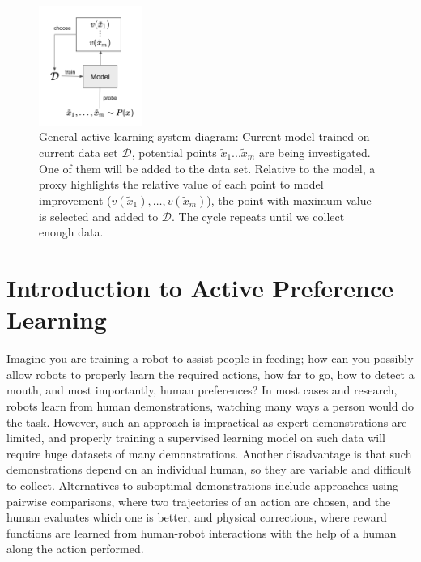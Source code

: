 \documentclass[
  letterpaper,
  DIV=11,
  numbers=noendperiod,
  oneside]{scrreprt}
\theoremstyle{remark}
\begin{document}
\begin{figure}

{\centering \includegraphics[width=0.3\textwidth,height=\textheight]{Figures/active_learning_schema.png}

}

\caption{General active learning system diagram: Current model trained
on current data set \(\mathcal{D}\), potential points
\(\tilde{x}_1...\tilde{x}_m\) are being investigated. One of them will
be added to the data set. Relative to the model, a proxy highlights the
relative value of each point to model improvement
(\(v(\tilde{x}_1), \ldots, v(\tilde{x}_m)\)), the point with maximum
value is selected and added to \(\mathcal{D}\). The cycle repeats until
we collect enough data.}

\end{figure}%

\section{Introduction to Active Preference
Learning}\label{introduction-to-active-preference-learning}

Imagine you are training a robot to assist people in feeding; how can
you possibly allow robots to properly learn the required actions, how
far to go, how to detect a mouth, and most importantly, human
preferences? In most cases and research, robots learn from human
demonstrations, watching many ways a person would do the task. However,
such an approach is impractical as expert demonstrations are limited,
and properly training a supervised learning model on such data will
require huge datasets of many demonstrations. Another disadvantage is
that such demonstrations depend on an individual human, so they are
variable and difficult to collect. Alternatives to suboptimal
demonstrations include approaches using pairwise comparisons, where two
trajectories of an action are chosen, and the human evaluates which one
is better, and physical corrections, where reward functions are learned
from human-robot interactions with the help of a human along the action
performed.
\end{document}
